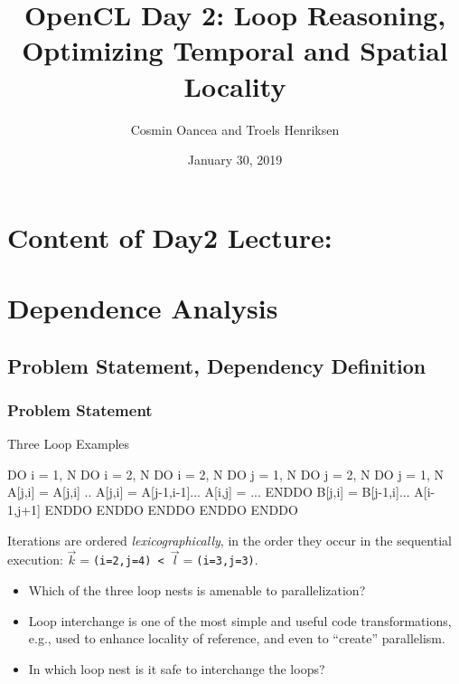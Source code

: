 \documentclass{beamer}
\title{OpenCL Day 2: Loop Reasoning, Optimizing Temporal and Spatial Locality}
\author{Cosmin Oancea and Troels Henriksen}
\date{January 30, 2019}
\newcommand{\emp}[1]{\textcolor{DikuRed}{ #1}}
\begin{document}
\frame{\titlepage}

\section{Content of Day2 Lecture:}

\begin{frame}
  \tableofcontents
\end{frame}

\section{Dependence Analysis}

\subsection{Problem Statement, Dependency Definition}
\begin{frame}[fragile,t]
  \frametitle{Problem Statement}

\begin{block}{Three Loop Examples}
\begin{colorcode}
DO i = 1, N            DO i = 2, N               DO i = 2, N
 DO j = 1, N            DO j = 2, N               DO j = 1, N 
   A[j,i] = A[j,i] ..     A[j,i] = A[j-1,i-1]...   A[i,j] = ...
 ENDDO                    B[j,i] = B[j-1,i]...       A[i-1,j+1]
ENDDO                  ENDDO ENDDO               ENDDO ENDDO
\end{colorcode}
\end{block} 

Iterations are ordered {\em lexicographically}, in the order
they occur in the sequential execution: 
{\tt$\vec{k}=$(i=2,j=4) < $\vec{l}=$(i=3,j=3)}.

\bigskip

\begin{itemize}
    \item \emp{Which of the three loop nests is amenable to parallelization?}\smallskip
    \item Loop interchange is one of the most simple and useful code transformations,
            e.g., used to enhance locality of reference, and even to ``create'' 
            parallelism.\smallskip
    \item \emp{In which loop nest is it safe to interchange the loops?}
\end{itemize}

\end{frame}
\end{document}
